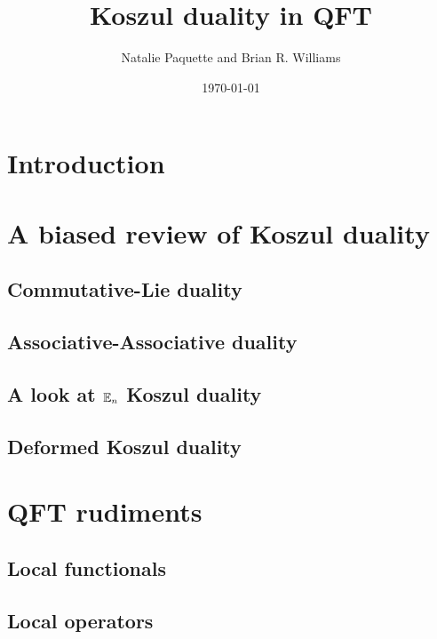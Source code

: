 \documentclass[11pt]{amsart}
\author{Natalie Paquette and Brian R. Williams}
\date{\today}
\title{Koszul duality in QFT}
\begin{document}
\maketitle


\section{Introduction}

\section{A biased review of Koszul duality} 


\subsection{Commutative-Lie duality}


\subsection{Associative-Associative duality} 


\subsection{A look at $\mathbb E_n$ Koszul duality}

\subsection{Deformed Koszul duality}

\section{QFT rudiments}

\subsection{Local functionals} 

\subsection{Local operators}
\end{document}

